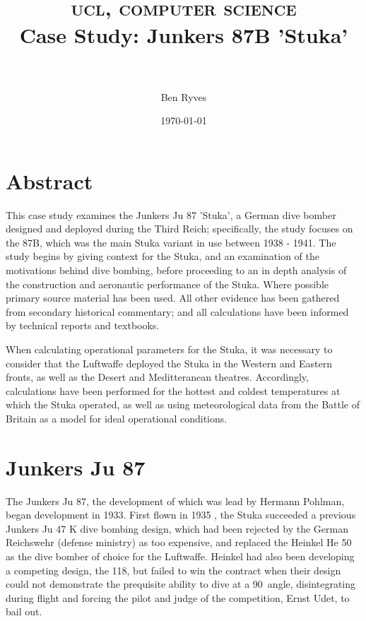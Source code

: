 \documentclass[a4paper, fontsize=11pt]{scrartcl} %
\title{
  \normalfont \normalsize
  \textsc{ucl, computer science}
  \horrule{0.5pt} \\[0.4cm]
  \huge{Case Study: Junkers 87B 'Stuka'}\\
  \horrule{0.5pt} \\[0.5cm]
}
\author{Ben Ryves}
\date{\normalsize\today}
\begin{document}
\maketitle
\tableofcontents
\section{Abstract}
This case study examines the Junkers Ju 87 'Stuka', a German dive bomber
designed and deployed during the Third Reich; specifically, the study
focuses on the 87B, which was the main Stuka variant in use between 1938 - 1941.
The study begins by giving context for the Stuka, and an examination of the motivations behind dive
bombing, before proceeding to an in depth analysis of the construction
and aeronautic performance of the Stuka. Where possible primary source
material has been used. All other evidence has been
gathered from secondary historical commentary; and all calculations have
been informed by technical reports and textbooks.

When calculating operational parameters for the Stuka, it was necessary
to consider that the Luftwaffe deployed the Stuka in the Western and
Eastern fronts, as well as the Desert and Meditteranean theatres.
Accordingly, calculations have been performed for the hottest and
coldest temperatures at which the Stuka operated, as well as using
meteorological data from the Battle of Britain as a model for ideal
operational conditions.
\section{Junkers Ju 87}

The Junkers Ju 87, the development of
which was lead by Hermann Pohlman, began development in 1933. First flown
in 1935 \autocite[p.~9]{weal97}, the Stuka succeeded a previous
Junkers Ju 47 K dive bombing design, which had been rejected by the
German Reichswehr (defense ministry) as too expensive, and replaced the
Heinkel He 50 as the dive bomber of choice for the Luftwaffe. Heinkel
had also been developing a competing design, the 118, but failed to win the
contract when their design could not demonstrate the prequisite
ability to dive at a 90\textdegree\ angle, disintegrating during flight
\autocite[p.~68-69]{killen67} and forcing the pilot and judge of the
competition, Ernst Udet, to bail out.
\end{document}
